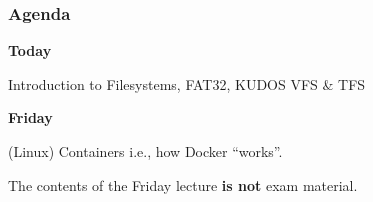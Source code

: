 \begin{frame}

\frametitle{Agenda}

\vspace{\fill}


\begin{center}

{\large \textbf{Today}}

Introduction to Filesystems, FAT32, KUDOS VFS \& TFS

\end{center}

\vspace{\fill}




\begin{center}


{\large \textbf{Friday}}

(Linux) Containers i.e., how Docker ``works''.

The contents of the Friday lecture \textbf{is not} exam material.

\end{center}

\vspace{\fill}

\end{frame}
